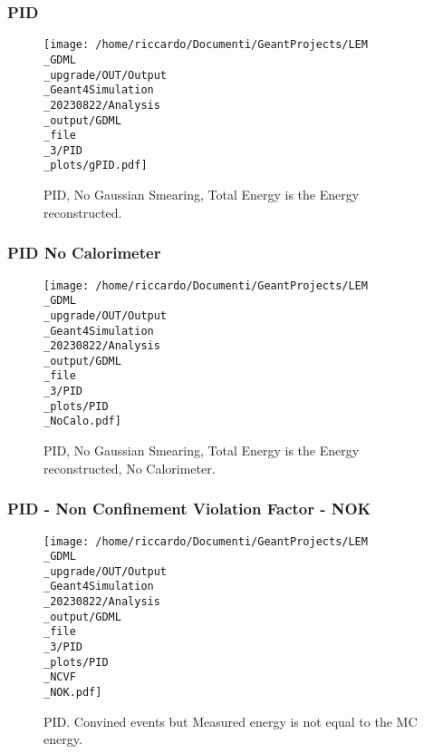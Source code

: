 \documentclass[8pt]{beamer}
\begin{document}
\begin{frame}
\begin{table}
\begin{tabular}{lll}
            \bottomrule
            \end{tabular}
            \end{table}
            
            \end{frame}
            
            \begin{frame}
                \frametitle{PID}
            
        \begin{figure}[h]
            \centering
            \texttt{[image: /home/riccardo/Documenti/GeantProjects/LEM\\\_GDML\\\_upgrade/OUT/Output\\\_Geant4Simulation\\\_20230822/Analysis\\\_output/GDML\\\_file\\\_3/PID\\\_plots/gPID.pdf]}
            \caption{PID, No Gaussian Smearing, Total Energy is the Energy reconstructed.}
        \end{figure}
        
            \end{frame}
            
            \begin{frame}
                \frametitle{PID No Calorimeter}
            
        \begin{figure}[h]
            \centering
            \texttt{[image: /home/riccardo/Documenti/GeantProjects/LEM\\\_GDML\\\_upgrade/OUT/Output\\\_Geant4Simulation\\\_20230822/Analysis\\\_output/GDML\\\_file\\\_3/PID\\\_plots/PID\\\_NoCalo.pdf]}
            \caption{PID, No Gaussian Smearing, Total Energy is the Energy reconstructed, No Calorimeter.}
        \end{figure}
        
            \end{frame}
            
            \begin{frame}
                \frametitle{PID - Non Confinement Violation Factor - NOK}
            
        \begin{figure}[h]
            \centering
            \texttt{[image: /home/riccardo/Documenti/GeantProjects/LEM\\\_GDML\\\_upgrade/OUT/Output\\\_Geant4Simulation\\\_20230822/Analysis\\\_output/GDML\\\_file\\\_3/PID\\\_plots/PID\\\_NCVF\\\_NOK.pdf]}
            \caption{PID. Convined events but Measured energy is not equal to the MC energy.}
        \end{figure}
        
            \end{frame}
            
\end{document}

